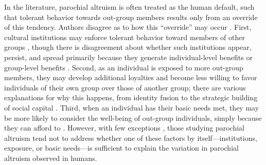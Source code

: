 \documentclass[bibauthoryear]{aa}
\begin{document}
In the literature, parochial altruism is often treated as the human default, such that tolerant behavior towards out-group members results only from an override of this tendency. %
 Authors disagree as to how this ``override'' may occur \citep{pisor2019evolution}. First, cultural institutions may enforce tolerant behavior toward members of other groups \citep{fearon1996explaining, fry2018evolutionary}, though there is disagreement about whether such institutions appear, persist, and spread primarily because they generate individual-level benefits or group-level benefits \citep[see][for a useful discussion]{purzycki2020institutions}. Second, as an individual is exposed to more out-group members, they may develop additional loyalties and become less willing to favor individuals of their own group over those of another group; there are various explanations for why this happens, from identity fusion to the strategic building of social capital \citep{brewer1976ethnocentrism, beck2006cosmopolitan, buchan2009globalization, fukuyama2001social, hruschka2013economic, mau2008cosmopolitan, singer2011expanding}. Third, when an individual has their basic needs met, they may be more likely to consider the well-being of out-group individuals, simply because they can afford to \citep{hruschka2014impartial, silva2014cooperation}. However, with few exceptions \citep{hruschka2013economic, vardy2019property}, those studying parochial altruism tend not to address whether one of these factors by itself---institutions, exposure, or basic needs---is sufficient to explain the variation in parochial altruism observed in humans.
\end{document}
